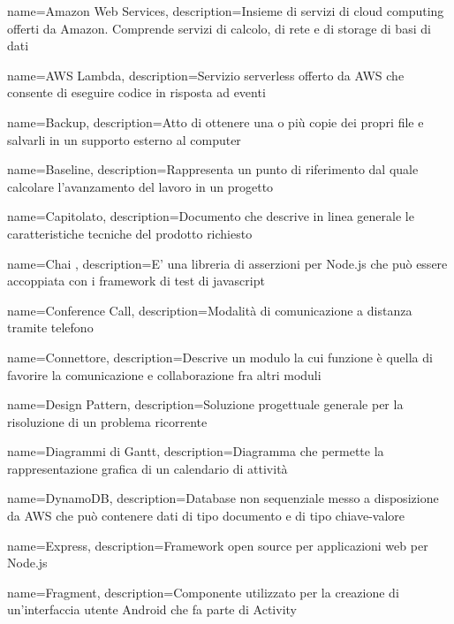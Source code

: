 {
	name={Amazon Web Services},
	description={Insieme di servizi di cloud computing offerti da Amazon. Comprende servizi di calcolo, di rete e di storage di basi di dati}
}

{
	name={AWS Lambda},
	description={Servizio serverless offerto da AWS che consente di eseguire codice in risposta ad eventi}
}

{
	name={Backup},
	description={Atto di ottenere una o più copie dei propri file e salvarli in un supporto esterno al computer}
}

{
	name={Baseline},
	description={Rappresenta un punto di riferimento dal quale calcolare l’avanzamento del lavoro in un progetto}
}

{
	name={Capitolato},
	description={Documento che descrive in linea generale le caratteristiche tecniche del prodotto richiesto}
}

{
	name={Chai },
	description={E' una libreria di asserzioni per Node.js che può essere accoppiata con i framework di test di javascript}
}

{
	name={Conference Call},
	description={Modalità di comunicazione a distanza tramite telefono}
}

{
	name={Connettore},
	description={Descrive un modulo la cui funzione è quella di favorire la comunicazione e collaborazione fra altri moduli}
}

{
	name={Design Pattern},
	description={Soluzione progettuale generale per la risoluzione di un problema ricorrente}
}

{
	name={Diagrammi di Gantt},
	description={Diagramma che permette la rappresentazione grafica di un calendario di attività}
}

{
	name={DynamoDB},
	description={Database non sequenziale messo a disposizione da AWS che può contenere dati di tipo documento e di tipo chiave-valore}
}

{
	name={Express},
	description={Framework open source per applicazioni web per Node.js}
}

{
	name={Fragment},
	description={Componente utilizzato per la creazione di un'interfaccia utente Android che fa parte di Activity}
}

